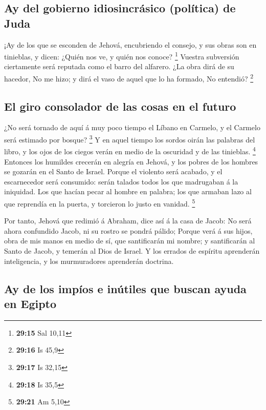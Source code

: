 \hypertarget{ay-del-gobierno-idiosincruxe1sico-poluxedtica-de-juda}{%
\subsection{Ay del gobierno idiosincrásico (política) de
Juda}\label{ay-del-gobierno-idiosincruxe1sico-poluxedtica-de-juda}}

 ¡Ay de los que se esconden de Jehová, encubriendo el
consejo, y sus obras son en tinieblas, y dicen: ¿Quién nos ve, y quién
nos conoce? \footnote{\textbf{29:15} Sal 10,11}  Vuestra
subversión ciertamente será reputada como el barro del alfarero. ¿La
obra dirá de su hacedor, No me hizo; y dirá el vaso de aquel que lo ha
formado, No entendió? \footnote{\textbf{29:16} Is 45,9}

\hypertarget{el-giro-consolador-de-las-cosas-en-el-futuro}{%
\subsection{El giro consolador de las cosas en el
futuro}\label{el-giro-consolador-de-las-cosas-en-el-futuro}}

 ¿No será tornado de aquí á muy poco tiempo el Líbano en
Carmelo, y el Carmelo será estimado por bosque? \footnote{\textbf{29:17}
  Is 32,15}  Y en aquel tiempo los sordos oirán las
palabras del libro, y los ojos de los ciegos verán en medio de la
oscuridad y de las tinieblas. \footnote{\textbf{29:18} Is 35,5}
 Entonces los humildes crecerán en alegría en Jehová, y los
pobres de los hombres se gozarán en el Santo de Israel. 
Porque el violento será acabado, y el escarnecedor será consumido: serán
talados todos los que madrugaban á la iniquidad.  Los que
hacían pecar al hombre en palabra; los que armaban lazo al que reprendía
en la puerta, y torcieron lo justo en vanidad. \footnote{\textbf{29:21}
  Am 5,10}

 Por tanto, Jehová que redimió á Abraham, dice así á la
casa de Jacob: No será ahora confundido Jacob, ni su rostro se pondrá
pálido;  Porque verá á sus hijos, obra de mis manos en
medio de sí, que santificarán mi nombre; y santificarán al Santo de
Jacob, y temerán al Dios de Israel.  Y los errados de
espíritu aprenderán inteligencia, y los murmuradores aprenderán
doctrina.

\hypertarget{ay-de-los-impuxedos-e-inuxfatiles-que-buscan-ayuda-en-egipto}{%
\subsection{Ay de los impíos e inútiles que buscan ayuda en
Egipto}\label{ay-de-los-impuxedos-e-inuxfatiles-que-buscan-ayuda-en-egipto}}

